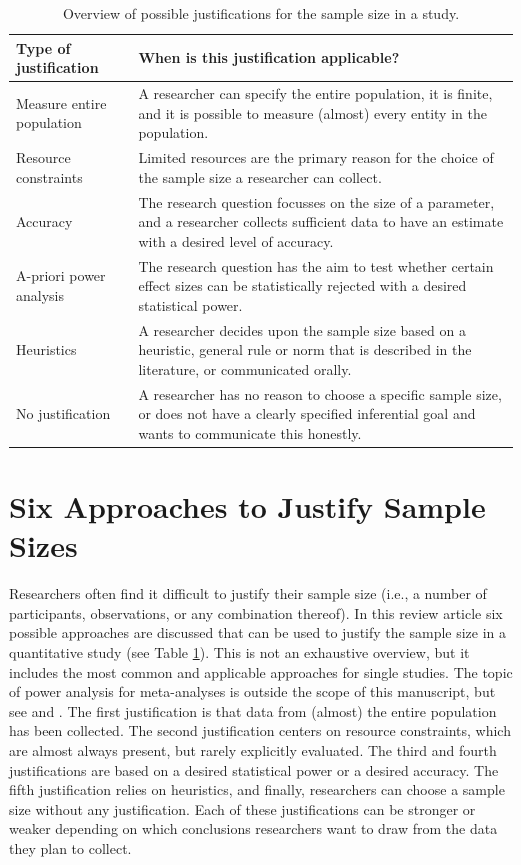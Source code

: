 \documentclass[
  oneside]{book}
\begin{document}
\begin{table}

\caption{\label{tab:table-pow-just}Overview of possible justifications for the sample size in a study.}
\centering
\begin{tabular}[t]{l|l}
\hline
Type of justification & When is this justification applicable?\\
\hline
Measure entire population & A researcher can specify the entire population, it is finite, and it is possible to measure (almost) every entity in the population.\\
\hline
Resource constraints & Limited resources are the primary reason for the choice of the sample size a researcher can collect.\\
\hline
Accuracy & The research question focusses on the size of a parameter, and a researcher collects sufficient data to have an estimate with a desired level of accuracy.\\
\hline
A-priori power analysis & The research question has the aim to test whether certain effect sizes can be statistically rejected with a desired statistical power.\\
\hline
Heuristics & A researcher decides upon the sample size based on a heuristic, general rule or norm that is described in the literature, or communicated orally.\\
\hline
No justification & A researcher has no reason to choose a specific sample size, or does not have a clearly specified inferential goal and wants to communicate this honestly.\\
\hline
\end{tabular}
\end{table}

\hypertarget{six-approaches-to-justify-sample-sizes}{%
\section{Six Approaches to Justify Sample Sizes}\label{six-approaches-to-justify-sample-sizes}}

Researchers often find it difficult to justify their sample size (i.e., a number of participants, observations, or any combination thereof). In this review article six possible approaches are discussed that can be used to justify the sample size in a quantitative study (see Table \ref{tab:table-pow-just}). This is not an exhaustive overview, but it includes the most common and applicable approaches for single studies. The topic of power analysis for meta-analyses is outside the scope of this manuscript, but see \citet{hedges_power_2001} and \citet{valentine_how_2010}. The first justification is that data from (almost) the entire population has been collected. The second justification centers on resource constraints, which are almost always present, but rarely explicitly evaluated. The third and fourth justifications are based on a desired statistical power or a desired accuracy. The fifth justification relies on heuristics, and finally, researchers can choose a sample size without any justification. Each of these justifications can be stronger or weaker depending on which conclusions researchers want to draw from the data they plan to collect.
\end{document}
